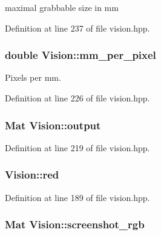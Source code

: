 maximal grabbable size in mm 



Definition at line 237 of file vision.\+hpp.

\subsubsection[{\texorpdfstring{mm\+\_\+per\+\_\+pixel}{mm_per_pixel}}]{\setlength{\rightskip}{0pt plus 5cm}double Vision\+::mm\+\_\+per\+\_\+pixel\hspace{0.3cm}{\ttfamily [private]}}\hypertarget{class_vision_a8f96f153fed9e8805a471852ca66e92b}{}\label{class_vision_a8f96f153fed9e8805a471852ca66e92b}


Pixels per mm. 



Definition at line 226 of file vision.\+hpp.

\subsubsection[{\texorpdfstring{output}{output}}]{\setlength{\rightskip}{0pt plus 5cm}Mat Vision\+::output\hspace{0.3cm}{\ttfamily [private]}}\hypertarget{class_vision_af7343aec964f7367e29f3534c2a4e8a8}{}\label{class_vision_af7343aec964f7367e29f3534c2a4e8a8}


Definition at line 219 of file vision.\+hpp.

\subsubsection[{\texorpdfstring{red}{red}}]{ Vision\+::red\hspace{0.3cm}{\ttfamily [private]}}\hypertarget{class_vision_ad38a66e586f5d654be18ec7b292e73a7}{}\label{class_vision_ad38a66e586f5d654be18ec7b292e73a7}


Definition at line 189 of file vision.\+hpp.

\subsubsection[{\texorpdfstring{screenshot\+\_\+rgb}{screenshot_rgb}}]{\setlength{\rightskip}{0pt plus 5cm}Mat Vision\+::screenshot\+\_\+rgb\hspace{0.3cm}{\ttfamily [private]}}\hypertarget{class_vision_ad8af9d726d385407fa2b5a58af014bb6}{}\label{class_vision_ad8af9d726d385407fa2b5a58af014bb6}


